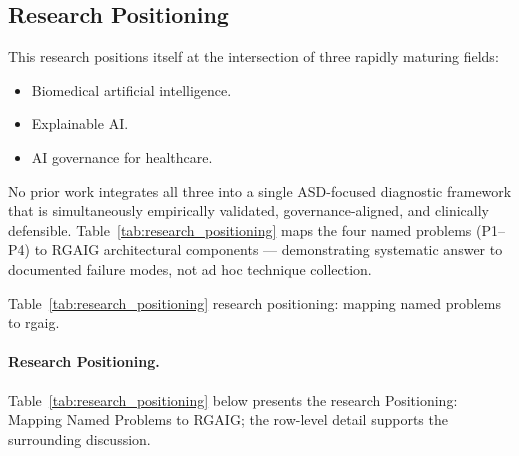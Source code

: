 \subsection{Research Positioning}
\label{sec:research_positioning}

This research positions itself at the intersection of three rapidly maturing fields:
\begin{itemize}[leftmargin=*, itemsep=2pt]
    \item Biomedical artificial intelligence.
    \item Explainable AI.
    \item AI governance for healthcare.
\end{itemize}
\noindent No prior work integrates all three into a single ASD-focused diagnostic framework that is simultaneously empirically validated, governance-aligned, and clinically defensible. Table~\ref{tab:research_positioning} maps the four named problems (P1--P4) to RGAIG architectural components --- demonstrating systematic answer to documented failure modes, not ad hoc technique collection.

\noindent Table~\ref{tab:research_positioning} research positioning: mapping named problems to rgaig.

\paragraph{Research Positioning.}


\noindent Table~\ref{tab:research_positioning} below presents the research Positioning: Mapping Named Problems to RGAIG; the row-level detail supports the surrounding discussion.

